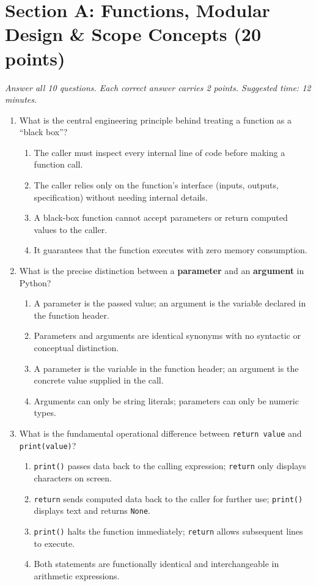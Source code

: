 \documentclass[11pt,a4paper]{article}
\begin{document}
\section*{Section A: Functions, Modular Design \& Scope Concepts \hfill \normalsize\normalfont(20 points)}
\textit{Answer all 10 questions. Each correct answer carries 2 points. Suggested time: 12 minutes.}

\begin{enumerate}[label=\textbf{Q\arabic*.},leftmargin=2em,itemsep=1pt,topsep=1pt]

\item What is the central engineering principle behind treating a function as a ``black box''?
\begin{enumerate}[label=\Alph*.,leftmargin=2em]
  \item The caller must inspect every internal line of code before making a function call.
  \item The caller relies only on the function's interface (inputs, outputs, specification) without needing internal details.
  \item A black-box function cannot accept parameters or return computed values to the caller.
  \item It guarantees that the function executes with zero memory consumption.
\end{enumerate}

\item What is the precise distinction between a \textbf{parameter} and an \textbf{argument} in Python?
\begin{enumerate}[label=\Alph*.,leftmargin=2em]
  \item A parameter is the passed value; an argument is the variable declared in the function header.
  \item Parameters and arguments are identical synonyms with no syntactic or conceptual distinction.
  \item A parameter is the variable in the function header; an argument is the concrete value supplied in the call.
  \item Arguments can only be string literals; parameters can only be numeric types.
\end{enumerate}

\item What is the fundamental operational difference between \texttt{return value} and \texttt{print(value)}?
\begin{enumerate}[label=\Alph*.,leftmargin=2em]
  \item \texttt{print()} passes data back to the calling expression; \texttt{return} only displays characters on screen.
  \item \texttt{return} sends computed data back to the caller for further use; \texttt{print()} displays text and returns \texttt{None}.
  \item \texttt{print()} halts the function immediately; \texttt{return} allows subsequent lines to execute.
  \item Both statements are functionally identical and interchangeable in arithmetic expressions.
\end{enumerate}


\end{enumerate}
\end{document}
